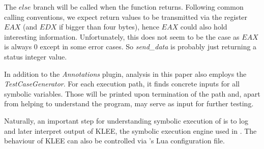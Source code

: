 The $else$ branch will be called when the function returns.
Following common calling conventions, we expect return values to be transmitted via the register $EAX$ (and $EDX$ if bigger than four bytes), hence $EAX$ could also hold interesting information.
Unfortunately, this does not seem to be the case as $EAX$ is always $0$ except in some error cases.
So \textit{send\_data} is probably just returning a status integer value.










\bigskip

In addition to the \textit{Annotations} plugin, analysis in this paper also employs the \textit{TestCaseGenerator}.
For each execution path, it finds concrete inputs for all symbolic variables.
Those will be printed upon termination of the path and, apart from helping to understand the program, may serve as input for further testing.

\bigskip

Naturally, an important step for understanding symbolic execution of \app is to log and later interpret output of KLEE, the symbolic execution engine used in \sse.
The behaviour of KLEE can also be controlled via \sse's Lua configuration file.



\iffalse
§5 	Implementation (of the test case using S2E)
		> Vorgehen
		> Verwendete Konsistenzmodelle
		> Arbeitsweise von Selektoren/Analysatoren
\fi

